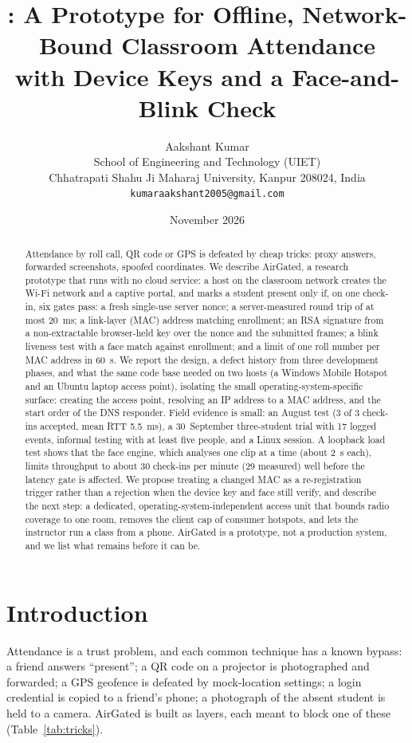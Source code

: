 \documentclass[11pt,a4paper]{article}
\title{\sys: A Prototype for Offline, Network-Bound Classroom Attendance\\with Device Keys and a Face-and-Blink Check}
\author{Aakshant Kumar\\
\small School of Engineering and Technology (UIET)\\
\small Chhatrapati Shahu Ji Maharaj University, Kanpur 208024, India\\
\small \texttt{kumaraakshant2005@gmail.com}}
\date{November 2026}
\newcommand{\sys}{AirGated}
\begin{document}
\maketitle

\begin{abstract}
Attendance by roll call, QR code or GPS is defeated by cheap tricks: proxy answers, forwarded screenshots, spoofed coordinates. We describe \sys{}, a research prototype that runs with no cloud service: a host on the classroom network creates the Wi-Fi network and a captive portal, and marks a student present only if, on one check-in, six gates pass: a fresh single-use server nonce; a server-measured round trip of at most 20~ms; a link-layer (MAC) address matching enrollment; an RSA signature from a non-extractable browser-held key over the nonce and the submitted frames; a blink liveness test with a face match against enrollment; and a limit of one roll number per MAC address in 60~s. We report the design, a defect history from three development phases, and what the same code base needed on two hosts (a Windows Mobile Hotspot and an Ubuntu laptop access point), isolating the small operating-system-specific surface: creating the access point, resolving an IP address to a MAC address, and the start order of the DNS responder. Field evidence is small: an August test (3 of 3 check-ins accepted, mean RTT 5.5~ms), a 30~September three-student trial with 17 logged events, informal testing with at least five people, and a Linux session. A loopback load test shows that the face engine, which analyses one clip at a time (about 2~s each), limits throughput to about 30 check-ins per minute (29 measured) well before the latency gate is affected. We propose treating a changed MAC as a re-registration trigger rather than a rejection when the device key and face still verify, and describe the next step: a dedicated, operating-system-independent access unit that bounds radio coverage to one room, removes the client cap of consumer hotspots, and lets the instructor run a class from a phone. \sys{} is a prototype, not a production system, and we list what remains before it can be.
\end{abstract}

\section{Introduction}
Attendance is a trust problem, and each common technique has a known bypass: a friend answers ``present''; a QR code on a projector is photographed and forwarded; a GPS geofence is defeated by mock-location settings; a login credential is copied to a friend's phone; a photograph of the absent student is held to a camera. \sys{} is built as layers, each meant to block one of these (Table~\ref{tab:tricks}).
\end{document}
